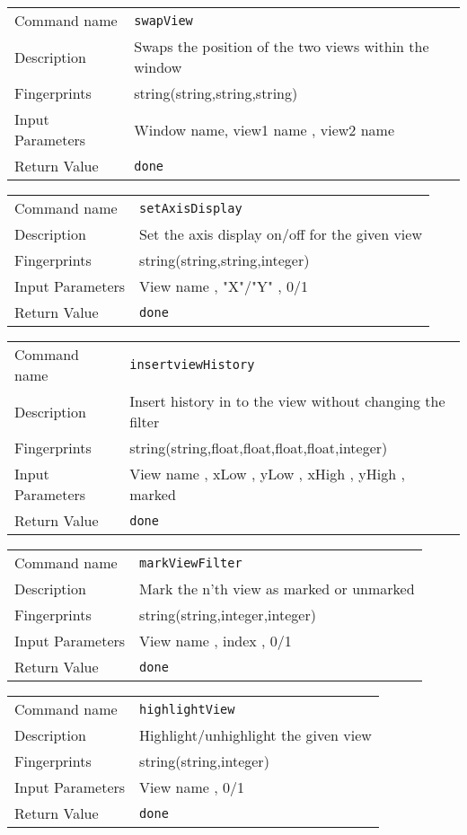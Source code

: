 \noindent
\begin{tabular}{l|p{5in}}
\hline
Command name &{\tt swapView }\\ 
Description &
 Swaps the position of the two views within the window 
 	\\
Fingerprints & string(string,string,string)\\
Input Parameters& Window name, view1 name , view2 name \\
Return Value&{\tt done}\\
\hline
\end{tabular}
\bigskip

\noindent
\begin{tabular}{l|p{5in}}
\hline
Command name &{\tt setAxisDisplay }\\ 
Description &
 Set the axis display on/off for the given view 
 	\\
Fingerprints & string(string,string,integer)\\
Input Parameters& View name , "X"/"Y" , 0/1 \\
Return Value&{\tt done}\\
\hline
\end{tabular}
\bigskip

\noindent
\begin{tabular}{l|p{5in}}
\hline
Command name &{\tt insertviewHistory }\\ 
Description &
 Insert history in to the view without changing the filter 
 	\\
Fingerprints & string(string,float,float,float,float,integer)\\
Input Parameters& View name , xLow , yLow , xHigh , yHigh , marked \\
Return Value&{\tt done}\\
\hline
\end{tabular}
\bigskip

\noindent
\begin{tabular}{l|p{5in}}
\hline
Command name &{\tt markViewFilter }\\ 
Description &
 Mark the n'th view as marked or unmarked 
 	\\
Fingerprints & string(string,integer,integer)\\
Input Parameters& View name , index , 0/1 \\
Return Value&{\tt done}\\
\hline
\end{tabular}
\bigskip

\noindent
\begin{tabular}{l|p{5in}}
\hline
Command name &{\tt highlightView }\\ 
Description &
 Highlight/unhighlight the given view 
 	\\
Fingerprints & string(string,integer)\\
Input Parameters& View name , 0/1 \\
Return Value&{\tt done}\\
\hline
\end{tabular}
\bigskip

